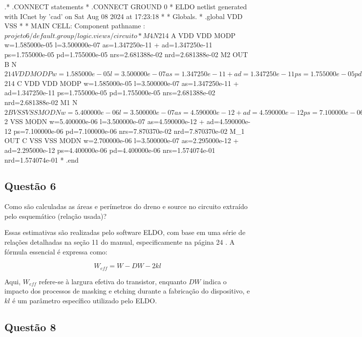 \documentclass[12pt,a4paper]{article}
\begin{document}
\begin{codeblock}[title={Exemplo de Netlist}, label={lst:netlist}, listing options={language=TeX}]
.* .CONNECT statements
*
.CONNECT GROUND 0
* ELDO netlist generated with ICnet by 'cad' on Sat Aug 08 2024 at 17:23:18
*
* Globals.
*
.global VDD VSS
*
* MAIN CELL: Component pathname :
$projeto6/default.group/logic.views/circuito
*
M4 N$214 A VDD VDD MODP w=1.585000e-05 l=3.500000e-07
as=1.347250e-11
+ ad=1.347250e-11 ps=1.755000e-05 pd=1.755000e-05 nrs=2.681388e-02
nrd=2.681388e-02
M2 OUT B N$214 VDD MODP w=1.585000e-05 l=3.500000e-07
as=1.347250e-11
+ ad=1.347250e-11 ps=1.755000e-05 pd=1.755000e-05 nrs=2.681388e-02
nrd=2.681388e-02
M3 N$214 C VDD VDD MODP w=1.585000e-05 l=3.500000e-07
as=1.347250e-11
+ ad=1.347250e-11 ps=1.755000e-05 pd=1.755000e-05 nrs=2.681388e-02
nrd=2.681388e-02
M1 N$2 B VSS VSS MODN w=5.400000e-06 l=3.500000e-07 as=4.590000e-12
+ ad=4.590000e-12 ps=7.100000e-06 pd=7.100000e-06 nrs=7.870370e-02
nrd=7.870370e-02
M_2 OUT A N$2 VSS MODN w=5.400000e-06 l=3.500000e-07
as=4.590000e-12
+ ad=4.590000e-12 ps=7.100000e-06 pd=7.100000e-06 nrs=7.870370e-02
nrd=7.870370e-02
M_1 OUT C VSS VSS MODN w=2.700000e-06 l=3.500000e-07
as=2.295000e-12
+ ad=2.295000e-12 ps=4.400000e-06 pd=4.400000e-06 nrs=1.574074e-01
nrd=1.574074e-01
*
.end
\end{codeblock}

\subsection*{Questão 6}

Como são calculadas as áreas e perímetros do dreno e source no circuito extraído pelo esquemático (relação usada)?

Essas estimativas são realizadas pelo software ELDO, com base em uma série de relações detalhadas na seção 11 do manual, especificamente na página 24 \cite{ref1}. A fórmula essencial é expressa como:

$$
W_{eff} = W - DW - 2kl
$$

Aqui, $W_{eff}$ refere-se à largura efetiva do transistor, enquanto $DW$ indica o impacto dos processos de masking e etching durante a fabricação do dispositivo, e $kl$ é um parâmetro específico utilizado pelo ELDO.

\subsection*{Questão 8}
\end{document}
